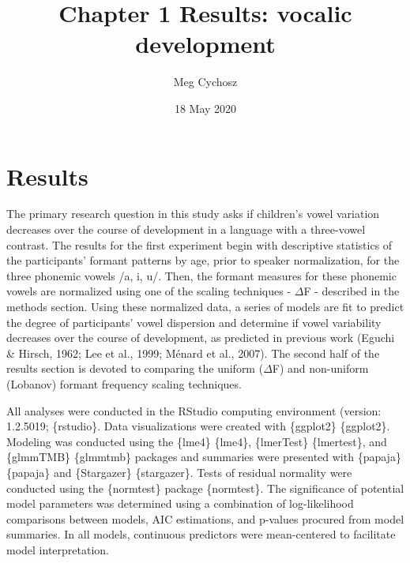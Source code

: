 \documentclass[
]{article}
\title{Chapter 1 Results: vocalic development}
\author{Meg Cychosz}
\date{18 May 2020}
\begin{document}
\maketitle

\hypertarget{results}{%
\section{Results}\label{results}}

The primary research question in this study asks if children's vowel variation decreases over the course of development in a language with a three-vowel contrast. The results for the first experiment begin with descriptive statistics of the participants' formant patterns by age, prior to speaker normalization, for the three phonemic vowels /a, i, u/. Then, the formant measures for these phonemic vowels are normalized using one of the scaling techniques - \(\Delta\)F - described in the methods section. Using these normalized data, a series of models are fit to predict the degree of participants' vowel dispersion and determine if vowel variability decreases over the course of development, as predicted in previous work (Eguchi \& Hirsch, 1962; Lee et al., 1999; Ménard et al., 2007). The second half of the results section is devoted to comparing the uniform (\(\Delta\)F) and non-uniform (Lobanov) formant frequency scaling techniques.

All analyses were conducted in the RStudio computing environment (version: 1.2.5019; \{rstudio\}. Data visualizations were created with \{ggplot2\} \{ggplot2\}. Modeling was conducted using the \{lme4\} \{lme4\}, \{lmerTest\} \{lmertest\}, and \{glmmTMB\} \{glmmtmb\} packages and summaries were presented with \{papaja\} \{papaja\} and \{Stargazer\} \{stargazer\}. Tests of residual normality were conducted using the \{normtest\} package \{normtest\}. The significance of potential model parameters was determined using a combination of log-likelihood comparisons between models, AIC estimations, and p-values procured from model summaries. In all models, continuous predictors were mean-centered to facilitate model interpretation.
\end{document}
